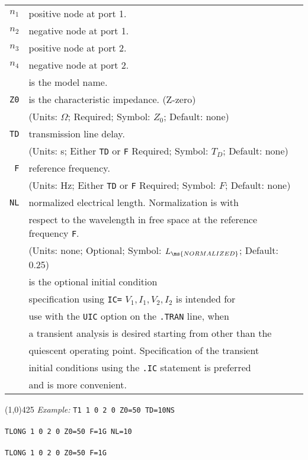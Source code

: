 \begin{tabular}{r l}
{\it $n_1$} & positive node at port 1.\\
{\it $n_2$} & negative node at port 1.\\
{\it $n_3$} & positive node at port 2.\\
{\it $n_4$} & negative node at port 2.\\
\notforsspice{{\it ModelName} & is the model name.}\\
{\tt Z0} & is the characteristic impedance. (Z-zero)\\
               & (Units: $\Omega$; Required; Symbol: $Z_0$; Default:
               none)\\
{\tt TD} & transmission line delay.\\
               & (Units: s; Either {\tt TD} or {\tt F} Required;
Symbol: $T_D$; Default: none)\\
{\tt F} & reference frequency.\\
               & (Units: Hz; Either {\tt TD} or {\tt F} Required;
Symbol: $F$; Default: none)\\
{\tt NL} & normalized electrical length. Normalization is with\\
& respect to the wavelength in free space at the reference frequency {\tt F}.\\
               & (Units: none; Optional; Symbol: $L_{\ms{NORMALIZED}}$; Default:
0.25)\\
\notforsspice{ {\tt IC} & is the optional  initial condition\\
& specification using {\tt IC=} $V_1,I_1,V_2,I_2$ is intended
for\\
& use with the {\tt UIC} option on  the  {\tt .TRAN}  line, when\\
& a transient analysis is desired starting from other than the\\
& quiescent operating point. Specification of the transient\\
& initial conditions using the {\tt .IC} statement is preferred\\
& and is more convenient.}
\end{tabular}
\newline
\linethickness{0.5mm} \line(1,0){425}
\newline
\textit{Example:}
\newline
\texttt{T1 1 0 2 0 Z0=50 TD=10NS\\ \\
         TLONG 1 0 2 0 Z0=50 F=1G NL=10\\ \\
         TLONG 1 0 2 0 Z0=50 F=1G}
